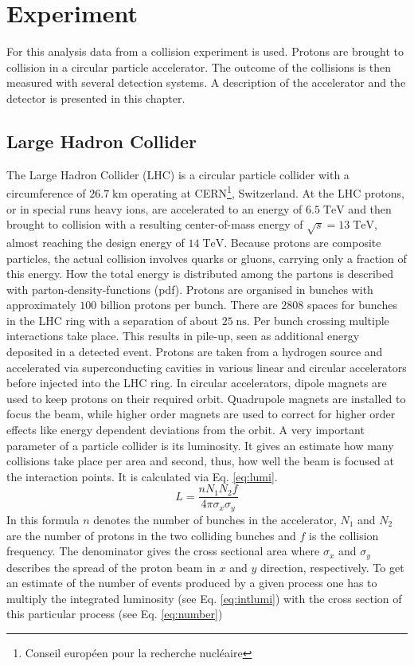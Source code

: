 \chapter{Experiment}
	For this analysis data from a collision experiment is used. Protons are brought to collision in a circular particle accelerator. The outcome of the collisions is then measured with several detection systems. A description of the accelerator and the detector is presented in this chapter.
\section{Large Hadron Collider}
	The Large Hadron Collider (LHC) is a circular particle collider with a circumference of $26.7\;\text{km}$ operating at CERN\footnote{Conseil europ\'{e}en pour la recherche nucl\'{e}aire}, Switzerland. At the LHC protons, or in special runs heavy ions, are accelerated to an energy of $6.5\;\text{TeV}$ and then brought to collision with a resulting center-of-mass energy of $\sqrt{s}=13\;\text{TeV}$, almost reaching the design energy of $14\;\text{TeV}$. Because protons are composite particles, the actual collision involves quarks or gluons, carrying only a fraction of this energy. How the total energy is distributed among the partons is described with parton-density-functions (pdf). Protons are organised in bunches with approximately $100$ billion protons per bunch. There are $2808$ spaces for bunches in the LHC ring with a separation of about $25\;\text{ns}$. Per bunch crossing multiple interactions take place. This results in pile-up, seen as additional energy deposited in a detected event.	Protons are taken from a hydrogen source and accelerated via superconducting cavities in various linear and circular accelerators before injected into the LHC ring. In circular accelerators, dipole magnets are used to keep protons on their required orbit. Quadrupole magnets are installed to focus the beam, while higher order magnets are used to correct for higher order effects like energy dependent deviations from the orbit. A very important parameter of a particle collider is its luminosity. It gives an estimate how many collisions take place per area and second, thus, how well the beam is focused at the interaction points. It is calculated via Eq. \ref{eq:lumi}. 
	\begin{equation}
	L = \frac{n N_1 N_2 f}{4 \pi \sigma_x \sigma_y}
	\label{eq:lumi}
	\end{equation} 
	In this formula $n$ denotes the number of bunches in the accelerator, $N_1$ and $N_2$ are the number of protons in the two colliding bunches and $f$ is the collision frequency. The denominator gives the cross sectional area where $\sigma_x$ and $\sigma_y$ describes the spread of the proton beam in $x$ and $y$ direction, respectively. To get an estimate of the number of events produced by a given process one has to multiply the integrated luminosity (see Eq. \ref{eq:intlumi}) with the cross section of this particular process (see Eq. \ref{eq:number})
